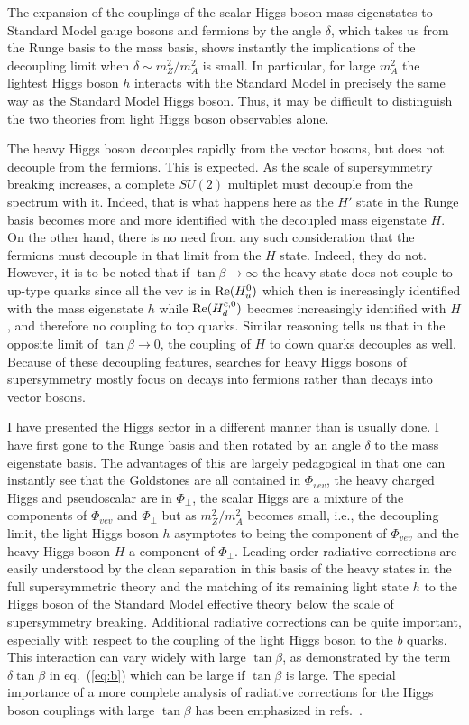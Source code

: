 \documentclass[12pt]{article}
\def\eq#1{eq.~(\ref{#1})}
\begin{document}
The expansion of the couplings of the scalar Higgs boson mass eigenstates to Standard Model gauge bosons and fermions  by the angle $\delta$, which takes us from the Runge basis to the mass basis, shows instantly  the implications of the decoupling limit when $\delta\sim m_Z^2/m_A^2$ is small.  In particular, for large $m_A^2$ the lightest Higgs boson $h$ interacts with the Standard Model in precisely the same way as the Standard Model Higgs boson. Thus, it may be difficult to distinguish the two theories from light Higgs boson observables alone. 

The heavy Higgs boson decouples rapidly from the vector bosons, but does not decouple from the fermions. This is expected. As the scale of supersymmetry breaking increases, a complete $SU(2)$ multiplet must decouple from the spectrum with it. Indeed, that is what happens here as the $H'$ state in the Runge basis becomes more and more identified with the decoupled mass eigenstate $H$. On the other hand, there is no need from any such consideration that the fermions must decouple in that limit from the $H$ state. Indeed, they do not. However, it is to be noted that if $\tan\beta\to \infty$ the heavy state does not couple to up-type quarks since all the vev is in ${\rm Re}(H_u^0)$ which then is increasingly  identified with the mass eigenstate $h$ while ${\rm Re}(H^{c,0}_d)$ becomes increasingly identified with $H$, and therefore no coupling to top quarks. Similar reasoning tells us that in the opposite limit of $\tan\beta\to 0$, the coupling of $H$ to down quarks decouples as well.  Because of these decoupling features, searches for heavy Higgs bosons of supersymmetry  mostly focus on decays into fermions rather than decays into vector bosons. 

I have presented the Higgs sector in a different manner than is usually done. I have first gone to the Runge basis and then rotated by an angle $\delta$ to the mass eigenstate basis. The advantages of this are largely pedagogical in that one can instantly see that the Goldstones are all contained in $\Phi_{vev}$, the heavy charged Higgs and pseudoscalar are in $\Phi_\perp$, the scalar Higgs are a mixture of the components of $\Phi_{vev}$ and $\Phi_\perp$ but as $m_Z^2/m_A^2$ becomes small, i.e., the decoupling limit, the light Higgs boson $h$ asymptotes to being the component of $\Phi_{vev}$ and the heavy Higgs  boson $H$ a component of $\Phi_\perp$. Leading order radiative corrections are easily understood by the clean separation in this basis of the heavy states in the full supersymmetric theory and the matching of its remaining light state $h$ to the Higgs boson of the Standard Model effective theory below the scale of supersymmetry breaking.  Additional radiative corrections can be quite important, especially with respect to the coupling of the light Higgs boson to the $b$ quarks. This interaction can vary widely with large $\tan\beta$, as demonstrated by the term $\delta \tan\beta$ in \eq{eq:b} which can be large if $\tan\beta$ is large.  The special importance of a more complete analysis of radiative corrections for the Higgs boson couplings with large $\tan\beta$ has been emphasized in refs.~\cite{Loinaz:1998ph,Carena:1998gk,Mrenna:2000qh,Heinemeyer:2000fa,Haber:2000kq,Gunion:2002zf}.
\end{document}
